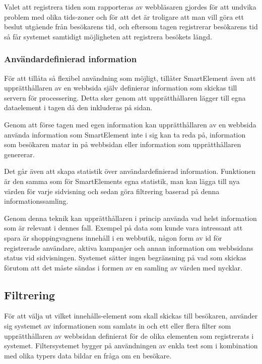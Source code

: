 Valet att registrera tiden som rapporteras av webbläsaren gjordes för att undvika problem med olika tids-zoner och för att det är troligare att man vill göra ett beslut utgående från besökarens tid, och eftersom tagen registrerar besökarens tid så får systemet samtidigt möjligheten att registrera besökets längd.

\subsubsection{Användardefinierad information}

För att tillåta så flexibel användning som möjligt, tillåter SmartElement även att upprätthållaren av en webbsida själv definierar information som skickas till servern för processering. Detta sker genom att upprätthållaren lägger till egna dataelement i tagen då den inkluderas på sidan.

Genom att förse tagen med egen information kan upprätthållaren av en webbsida använda information som SmartElement inte i sig kan ta reda på, information som besökaren matar in på webbsidan eller information som upprätthållaren genererar.

Det går även att skapa statistik över användardefinierad information. Funktionen är den samma som för SmartElements egna statistik, man kan lägga till nya värden för varje sidvisning och sedan göra filtrering baserad på denna informationssamling.

Genom denna teknik kan upprätthållaren i princip använda vad helst information som är relevant i dennes fall. Exempel på data som kunde vara intressant att spara är shoppingvagnens innehåll i en webbutik, någon form av id för registrerade användare, aktiva kampanjer och annan information om webbsidans status vid sidvisningen. Systemet sätter ingen begränsning på vad som skickas förutom att det måste sändas i formen av en samling av värden med nycklar.

\subsection{Filtrering}


För att välja ut vilket innehålls-element som skall skickas till besökaren, använder sig systemet av informationen som samlats in och ett eller flera filter som upprätthållaren av webbsidan definierat för de olika elementen som registrerats i systemet. Filtersystemet bygger på användningen av enkla test som i kombination med olika typers data bildar en fråga om en besökare.

